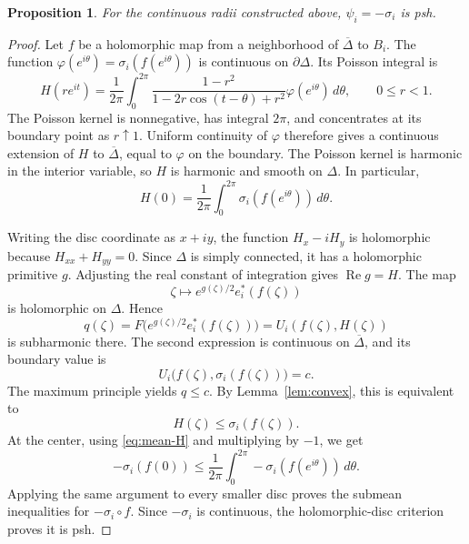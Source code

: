 \documentclass[11pt]{amsart}
\newtheorem{proposition}[theorem]{Proposition}
\theoremstyle{definition}
\theoremstyle{remark}
\numberwithin{equation}{section}
\begin{document}
\begin{proposition}\label{prop:psh-radius}
For the continuous radii constructed above, $\psi_i=-\sigma_i$ is psh.
\end{proposition}

\begin{proof}
Let $f$ be a holomorphic map from a neighborhood of $\overline\Delta$
to $B_i$. The function
$\varphi(e^{i\theta})=\sigma_i(f(e^{i\theta}))$ is continuous on
$\partial\Delta$. Its Poisson integral is
\begin{equation}\label{eq:poisson}
H(re^{it})=\frac1{2\pi}\int_0^{2\pi}
\frac{1-r^2}{1-2r\cos(t-\theta)+r^2}
\varphi(e^{i\theta})\,d\theta,\qquad 0\le r<1.
\end{equation}
The Poisson kernel is nonnegative, has integral $2\pi$, and
concentrates at its boundary point as $r\uparrow1$. Uniform continuity
of $\varphi$ therefore gives a continuous extension of $H$ to
$\overline\Delta$, equal to $\varphi$ on the boundary.
The Poisson kernel is harmonic in the interior variable, so $H$ is
harmonic and smooth on $\Delta$. In particular,
\begin{equation}\label{eq:mean-H}
H(0)=\frac1{2\pi}\int_0^{2\pi}\sigma_i(f(e^{i\theta}))\,d\theta.
\end{equation}

Writing the disc coordinate as $x+iy$, the function $H_x-iH_y$ is
holomorphic because $H_{xx}+H_{yy}=0$. Since $\Delta$ is simply
connected, it has a holomorphic primitive $g$. Adjusting the real
constant of integration gives $\operatorname{Re}g=H$.
The map
\[
\zeta\longmapsto e^{g(\zeta)/2}e_i^*(f(\zeta))
\]
is holomorphic on $\Delta$. Hence
\begin{equation}\label{eq:q}
q(\zeta)=F\bigl(e^{g(\zeta)/2}e_i^*(f(\zeta))\bigr)
=U_i(f(\zeta),H(\zeta))
\end{equation}
is subharmonic there. The second expression is continuous on
$\overline\Delta$, and its boundary value is
\[
U_i\bigl(f(\zeta),\sigma_i(f(\zeta))\bigr)=c.
\]
The maximum principle yields $q\le c$. By Lemma~\ref{lem:convex},
this is equivalent to
\[
H(\zeta)\le\sigma_i(f(\zeta)).
\]
At the center, using \eqref{eq:mean-H} and multiplying by $-1$, we get
\[
-\sigma_i(f(0))\le\frac1{2\pi}\int_0^{2\pi}
-\sigma_i(f(e^{i\theta}))\,d\theta.
\]
Applying the same argument to every smaller disc proves the
submean inequalities for $-\sigma_i\circ f$. Since $-\sigma_i$ is
continuous, the holomorphic-disc criterion proves it is psh.
\end{proof}
\end{document}
